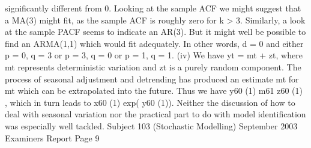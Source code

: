 significantly different from 0. Looking at the sample ACF we might
suggest that a MA(3) might fit, as the sample ACF is roughly zero for
k > 3. Similarly, a look at the sample PACF seems to indicate an
AR(3). But it might well be possible to find an ARMA(1,1) which
would fit adequately. In other words, d = 0 and either p = 0, q = 3 or
p = 3, q = 0 or p = 1, q = 1.
(iv) We have yt = mt + zt, where mt represents deterministic variation and zt is a
purely random component. The process of seasonal adjustment and
detrending has produced an estimate mt for mt which can be extrapolated into
the future. Thus we have y60 (1) m61 z60 (1) , which in turn leads to
x60 (1) exp( y60 (1)).
Neither the discussion of how to deal with seasonal variation nor the practical part to do with model
identification was especially well tackled.
Subject 103 (Stochastic Modelling) September 2003 Examiners Report
Page 9
